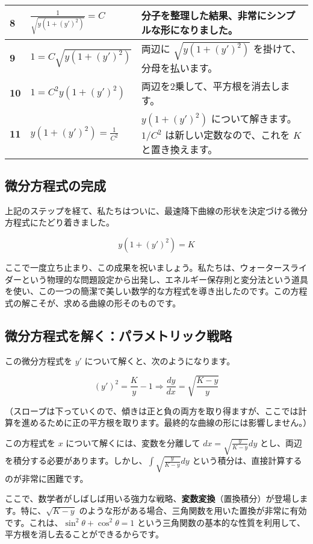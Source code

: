 \documentclass[12pt,a4paper]{ltjsarticle}
\begin{document}
\begin{longtable}{|p{1.2cm}|p{5.5cm}|p{6.5cm}|}
\hline
\textbf{8} & $\frac{1}{\sqrt{y(1+(y')^2)}} = C$ & 分子を整理した結果、非常にシンプルな形になりました。 \\
\hline
\textbf{9} & $1 = C \sqrt{y(1+(y')^2)}$ & 両辺に $\sqrt{y(1+(y')^2)}$ を掛けて、分母を払います。 \\
\hline
\textbf{10} & $1 = C^2 y(1+(y')^2)$ & 両辺を2乗して、平方根を消去します。 \\
\hline
\textbf{11} & $y(1+(y')^2) = \frac{1}{C^2}$ & $y(1+(y')^2)$ について解きます。$1/C^2$ は新しい定数なので、これを $K$ と置き換えます。 \\
\hline
\end{longtable}

\subsection{微分方程式の完成}

上記のステップを経て、私たちはついに、最速降下曲線の形状を決定づける微分方程式にたどり着きました。

\begin{equation}
y(1+(y')^2) = K
\end{equation}

ここで一度立ち止まり、この成果を祝いましょう。私たちは、ウォータースライダーという物理的な問題設定から出発し、エネルギー保存則と変分法という道具を使い、この一つの簡潔で美しい数学的な方程式を導き出したのです。この方程式の解こそが、求める曲線の形そのものです。

\subsection{微分方程式を解く：パラメトリック戦略}

この微分方程式を $y'$ について解くと、次のようになります。

\begin{equation}
(y')^2 = \frac{K}{y} - 1 \Rightarrow \frac{dy}{dx} = \sqrt{\frac{K-y}{y}}
\end{equation}

（スロープは下っていくので、傾きは正と負の両方を取り得ますが、ここでは計算を進めるために正の平方根を取ります。最終的な曲線の形には影響しません。）

この方程式を $x$ について解くには、変数を分離して $dx = \sqrt{\frac{y}{K-y}} dy$ とし、両辺を積分する必要があります。しかし、$\int \sqrt{\frac{y}{K-y}} dy$ という積分は、直接計算するのが非常に困難です。

ここで、数学者がしばしば用いる強力な戦略、\textbf{変数変換}（置換積分）が登場します。特に、$\sqrt{K-y}$ のような形がある場合、三角関数を用いた置換が非常に有効です。これは、$\sin^2\theta + \cos^2\theta = 1$ という三角関数の基本的な性質を利用して、平方根を消し去ることができるからです。
\end{document}
